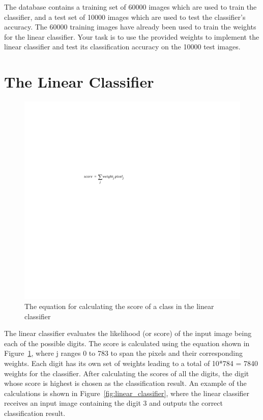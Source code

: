 \documentclass[epsfig,10pt,fullpage]{article}
\begin{document}
The database contains a training set of 60000 images which are used to train the classifier, and a test set of 10000 images which are used to test the classifier's accuracy. 
The 60000 training images have already been used to train the weights for the linear classifier. 
Your task is to use the provided weights to implement the linear classifier and test its classification accuracy on the 10000 test images.

\section*{The Linear Classifier}

\begin{figure}[H]
   \begin{center}
       \includegraphics[scale=1]{figures/fig_linear_classifier_equation}
   \end{center}
   \caption{The equation for calculating the score of a class in the linear classifier}
	\label{fig:linear_classifier_equation}
\end{figure}

The linear classifier evaluates the likelihood (or score) of the input image being each of the possible digits.
The score is calculated using the equation shown in Figure~\ref{fig:linear_classifier_equation}, where j ranges 0 to 783 to span the pixels and their corresponding weights.
Each digit has its own set of weights leading to a total of 10*784 = 7840 weights for the classifier.
After calculating the scores of all the digits, the digit whose score is highest is chosen as the classification result. 
An example of the calculations is shown in Figure~\ref{fig:linear_classifier}, where the linear classifier receives an input image containing the digit 3 and
outputs the correct classification result.
\end{document}
